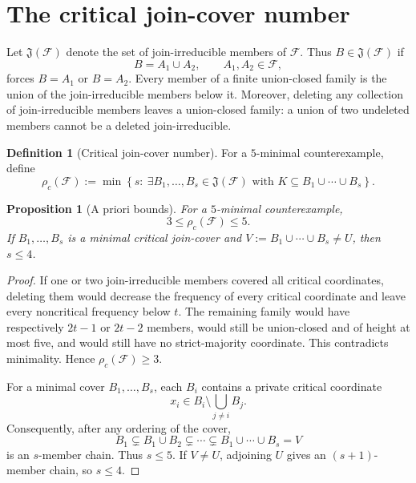 \documentclass[11pt,reqno]{amsart}
\numberwithin{equation}{section}
\newtheorem{proposition}[proposition]{Proposition}
\theoremstyle{definition}
\newtheorem{definition}[definition]{Definition}
\theoremstyle{remark}
\newcommand{\F}{\mathcal{F}}
\newcommand{\1}{\mathbf{1}}
\newcommand{\set}[1]{\left\{#1\right\}}
\begin{document}
\section{The critical join-cover number}\label{sec:critical-cover}

Let \(\mathfrak J(\F)\) denote the set of join-irreducible members of \(\F\).  Thus \(B\in\mathfrak J(\F)\) if
\[
B=A_1\cup A_2,
\qquad A_1,A_2\in\F,
\]
forces \(B=A_1\) or \(B=A_2\).  Every member of a finite union-closed family is the union of the join-irreducible members below it.  Moreover, deleting any collection of join-irreducible members leaves a union-closed family: a union of two undeleted members cannot be a deleted join-irreducible.

\begin{definition}[Critical join-cover number]\label{def:critical-cover}
For a \(5\)-minimal counterexample, define
\begin{equation}\label{eq:rho-c}
\rho_c(\F)
:=
\min\set{s:\ \exists B_1,\dots,B_s\in\mathfrak J(\F)
\text{ with }K\subseteq B_1\cup\cdots\cup B_s}.
\end{equation}
\end{definition}

\begin{proposition}[A priori bounds]\label{prop:rho-bounds}
For a \(5\)-minimal counterexample,
\[
3\le \rho_c(\F)\le5.
\]
If \(B_1,\dots,B_s\) is a minimal critical join-cover and
\(
V:=B_1\cup\cdots\cup B_s\ne U
\), then \(s\le4\).
\end{proposition}

\begin{proof}
If one or two join-irreducible members covered all critical coordinates, deleting them would decrease the frequency of every critical coordinate and leave every noncritical frequency below \(t\).  The remaining family would have respectively \(2t-1\) or \(2t-2\) members, would still be union-closed and of height at most five, and would still have no strict-majority coordinate.  This contradicts minimality.  Hence \(\rho_c(\F)\ge3\).

For a minimal cover \(B_1,\dots,B_s\), each \(B_i\) contains a private critical coordinate
\[
x_i\in B_i\setminus\bigcup_{j\ne i}B_j.
\]
Consequently, after any ordering of the cover,
\[
B_1
\subsetneq B_1\cup B_2
\subsetneq\cdots\subsetneq
B_1\cup\cdots\cup B_s=V
\]
is an \(s\)-member chain.  Thus \(s\le5\).  If \(V\ne U\), adjoining \(U\) gives an \((s+1)\)-member chain, so \(s\le4\).
\end{proof}
\end{document}

